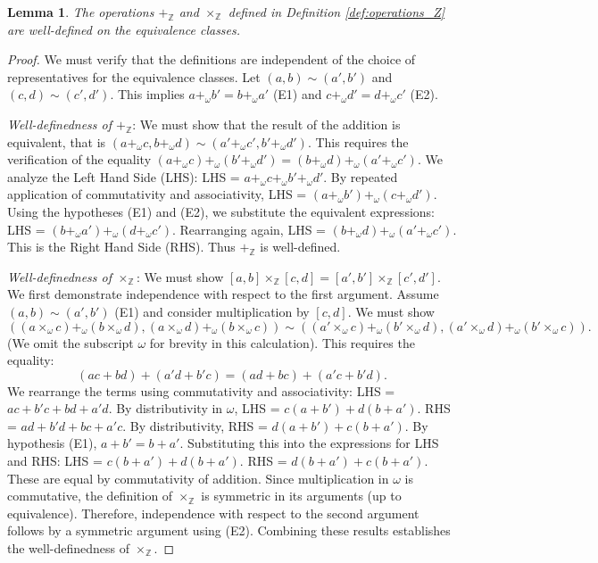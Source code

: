 \documentclass[11pt, a4paper]{article}
\theoremstyle{plain}
\newtheorem{lemma}[theorem]{Lemma}
\theoremstyle{definition}
\numberwithin{equation}{section}
\newcommand{\Z}{\mathbb{Z}}
\begin{document}
\begin{lemma}\label{lem:Z_ops_welldefined}
The operations $+_{\Z}$ and $\times_{\Z}$ defined in Definition \ref{def:operations_Z} are well-defined on the equivalence classes.
\end{lemma}
\begin{proof}
We must verify that the definitions are independent of the choice of representatives for the equivalence classes. Let $(a, b) \sim (a', b')$ and $(c, d) \sim (c', d')$.
This implies $a+_\omega b' = b+_\omega a'$ (E1) and $c+_\omega d' = d+_\omega c'$ (E2).

\emph{Well-definedness of $+_{\Z}$}: We must show that the result of the addition is equivalent, that is $(a+_\omega c, b+_\omega d) \sim (a'+_\omega c', b'+_\omega d')$.
This requires the verification of the equality $(a+_\omega c)+_\omega (b'+_\omega d') = (b+_\omega d)+_\omega (a'+_\omega c')$.
We analyze the Left Hand Side (LHS):
LHS = $a+_\omega c+_\omega b'+_\omega d'$. By repeated application of commutativity and associativity, LHS = $(a+_\omega b') +_\omega (c+_\omega d')$.
Using the hypotheses (E1) and (E2), we substitute the equivalent expressions: LHS = $(b+_\omega a') +_\omega (d+_\omega c')$.
Rearranging again, LHS = $(b+_\omega d)+_\omega (a'+_\omega c')$. This is the Right Hand Side (RHS).
Thus $+_{\Z}$ is well-defined.

\emph{Well-definedness of $\times_{\Z}$}: We must show $[a, b] \times_{\Z} [c, d] = [a', b'] \times_{\Z} [c', d']$.
We first demonstrate independence with respect to the first argument. Assume $(a, b) \sim (a', b')$ (E1) and consider multiplication by $[c, d]$. We must show
\begin{equation}
    ((a\times_\omega c)+_\omega(b\times_\omega d), (a\times_\omega d)+_\omega(b\times_\omega c)) \sim ((a'\times_\omega c)+_\omega(b'\times_\omega d), (a'\times_\omega d)+_\omega(b'\times_\omega c)).
\end{equation}
(We omit the subscript $\omega$ for brevity in this calculation). This requires the equality:
\begin{equation}
    (ac+bd) + (a'd+b'c) = (ad+bc) + (a'c+b'd).
\end{equation}
We rearrange the terms using commutativity and associativity:
LHS = $ac+b'c + bd+a'd$. By distributivity in $\omega$, LHS = $c(a+b') + d(b+a')$.
RHS = $ad+b'd + bc+a'c$. By distributivity, RHS = $d(a+b') + c(b+a')$.
By hypothesis (E1), $a+b' = b+a'$. Substituting this into the expressions for LHS and RHS:
LHS = $c(b+a') + d(b+a')$. RHS = $d(b+a') + c(b+a')$.
These are equal by commutativity of addition.
Since multiplication in $\omega$ is commutative, the definition of $\times_{\Z}$ is symmetric in its arguments (up to equivalence). Therefore, independence with respect to the second argument follows by a symmetric argument using (E2). Combining these results establishes the well-definedness of $\times_{\Z}$.
\end{proof}
\end{document}
